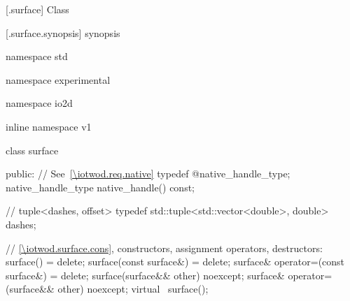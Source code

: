  [\iotwod.surface] {Class }

 [\iotwod.surface.synopsis] { synopsis}

\begin{codeblock}
namespace std { namespace experimental { namespace io2d { inline namespace v1 {
  class surface {
  public:
    // See~\ref{\iotwod.req.native}
    typedef @\impdef@ native_handle_type;
    native_handle_type native_handle() const;

    // tuple<dashes, offset>
    typedef std::tuple<std::vector<double>, double> dashes;

    // \ref{\iotwod.surface.cons}, constructors, assignment operators, destructors:
    surface() = delete;
    surface(const surface&) = delete;
    surface& operator=(const surface&) = delete;
    surface(surface&& other) noexcept;
    surface& operator=(surface&& other) noexcept;
    virtual ~surface();

}}}}}
\end{codeblock}
